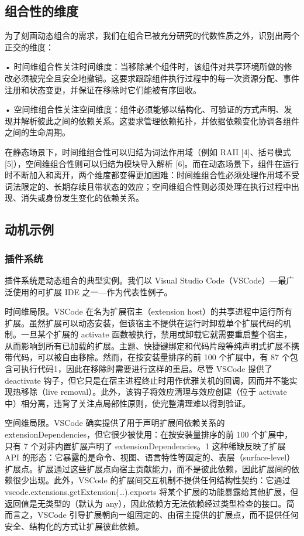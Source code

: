 \documentclass[
  10
]{article}
\begin{document}
\subsection{组合性的维度} \label{dimensions-of-composability}

为了刻画动态组合的需求，我们在组合已被充分研究的代数性质之外，识别出两个正交的维度：

• 时间维组合性关注时间维度：当移除某个组件时，该组件对共享环境所做的修改必须被完全且安全地撤销。这要求跟踪组件执行过程中的每一次资源分配、事件注册和状态变更，并保证在移除时它们能被有序回收。

• 空间维组合性关注空间维度：组件必须能够以结构化、可验证的方式声明、发现并解析彼此之间的依赖关系。这要求管理依赖拓扑，并依据依赖变化协调各组件之间的生命周期。

在静态场景下，时间维组合性可以归结为词法作用域（例如 RAII {[}4{]}、括号模式 {[}5{]}），空间维组合性则可以归结为模块导入解析 {[}6{]}。而在动态场景下，组件在运行时不断加入和离开，两个维度都变得更加困难：时间维组合性必须处理作用域不受词法限定的、长期存续且带状态的效应；空间维组合性则必须处理在执行过程中出现、消失或身份发生变化的依赖关系。

\subsection{动机示例} \label{motivating-examples}

\subsubsection{插件系统} \label{plugin-systems}

插件系统是动态组合的典型实例。我们以 Visual Studio Code（VSCode）---最广泛使用的可扩展 IDE 之一---作为代表性例子。

时间维局限。VSCode 在名为扩展宿主（extension host）的共享进程中运行所有扩展。虽然扩展可以动态安装，但该宿主不提供在运行时卸载单个扩展代码的机制。一旦某个扩展的 activate 函数被执行，禁用或卸载它就需要重启整个宿主，从而影响到所有已加载的扩展。主题、快捷键绑定和代码片段等纯声明式扩展不携带代码，可以被自由移除。然而，在按安装量排序的前 100 个扩展中，有 87 个包含可执行代码1，因此在移除时需要进行这样的重启。尽管 VSCode 提供了 deactivate 钩子，但它只是在宿主进程终止时用作优雅关机的回调，因而并不能实现热移除（live removal）。此外，该钩子将效应清理与效应创建（位于 activate 中）相分离，违背了关注点局部性原则，使完整清理难以得到验证。

空间维局限。VSCode 确实提供了用于声明扩展间依赖关系的 extensionDependencies，但它很少被使用：在按安装量排序的前 100 个扩展中，只有 7 个对非内置扩展声明了 extensionDependencies。1 这种稀缺反映了扩展 API 的形态：它暴露的是命令、视图、语言特性等固定的、表层（surface-level）扩展点。扩展通过这些扩展点向宿主贡献能力，而不是彼此依赖，因此扩展间的依赖很少出现。此外，VSCode 的扩展间交互机制不提供任何结构性契约：它通过 vscode.extensions.getExtension(\ldots).exports 将某个扩展的功能暴露给其他扩展，但返回值是无类型的（默认为 any），因此依赖方无法依赖经过类型检查的接口。简而言之，VSCode 引导扩展朝向一组固定的、由宿主提供的扩展点，而不提供任何安全、结构化的方式让扩展彼此依赖。
\end{document}
